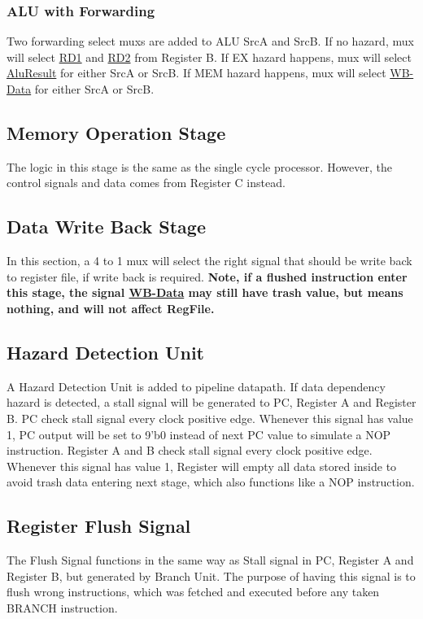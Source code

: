 \documentclass{article}
\begin{document}
	\subsubsection{ALU with Forwarding}
	Two forwarding select muxs are added to ALU SrcA and SrcB. If no hazard, mux will select \underline{RD1} and \underline{RD2} from Register B. If EX hazard happens, mux will select \underline{AluResult} for either SrcA or SrcB. If MEM hazard happens, mux will select \underline{WB-Data} for either SrcA or SrcB. 
	\subsection{Memory Operation Stage}
	The logic in this stage is the same as the single cycle processor. However, the control signals and data comes from Register C instead.
	\subsection{Data Write Back Stage}
	In this section, a 4 to 1 mux will select the right signal that should be write back to register file, if write back is required. \textbf{Note, if a flushed instruction enter this stage, the signal \underline{WB-Data} may still have trash value, but means nothing, and will not affect RegFile.}
	\subsection{Hazard Detection Unit}
	A Hazard Detection Unit is added to pipeline datapath. If data dependency hazard is detected, a stall signal will be generated to PC, Register A and Register B.
	PC check stall signal every clock positive edge. Whenever this signal has value 1, PC output will be set to 9'b0 instead of next PC value to simulate a NOP instruction.
	Register A and B check stall signal every clock positive edge. Whenever this signal has value 1, Register will empty all data stored inside to avoid trash data entering next stage, which also functions like a NOP instruction.
	\subsection{Register Flush Signal}
	The Flush Signal functions in the same way as Stall signal in PC, Register A and Register B, but generated by Branch Unit. The purpose of having this signal is to flush wrong instructions, which was fetched and executed before any taken BRANCH instruction.
	
\end{document}
